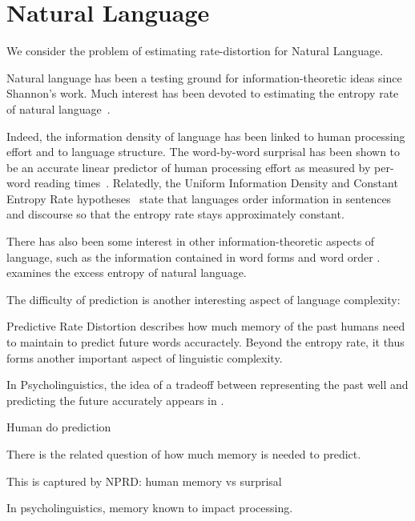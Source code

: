 \documentclass[11pt,letterpaper]{article}
\begin{document}
\section{Natural Language}

We consider the problem of estimating rate-distortion for Natural Language.


Natural language has been a testing ground for information-theoretic ideas since Shannon's work.
Much interest has been devoted to estimating the entropy rate of natural language~\citep{shannon1951prediction,takahira2016entropy,bentz2017entropy,takahashi2018cross}.


Indeed, the information density of language has been linked to human processing effort and to language structure.
The word-by-word surprisal has been shown to be an accurate linear predictor of human processing effort as measured by per-word reading times~\citep{hale-probabilistic-2001,levy-expectation-based-2008,smith-effect-2013}.
Relatedly, the Uniform Information Density and Constant Entropy Rate hypotheses~\citep{fenk1980konstanz, genzel2002entropy, jaeger2007speakers} state that languages order information in sentences and discourse so that the entropy rate stays approximately constant. %

There has also been some interest in other information-theoretic aspects of language, such as the information contained in word forms and word order \cite{koplenig2017statistical}.
\cite{dkebowski2018natural} examines the excess entropy of natural language.

The difficulty of prediction is another interesting aspect of language complexity:

Predictive Rate Distortion describes how much memory of the past humans need to maintain to predict future words accuractely.
Beyond the entropy rate, it thus forms another important aspect of linguistic complexity.


In Psycholinguistics, the idea of a tradeoff between representing the past well and predicting the future accurately appears in \cite{futrell-noisy-context-2017}.


Human do prediction



\cite{Bar:2007,Clark:2016}
There is the related question of how much memory is needed to predict.

This is captured by NPRD: human memory vs surprisal

In psycholinguistics, memory known to impact processing.
\end{document}
